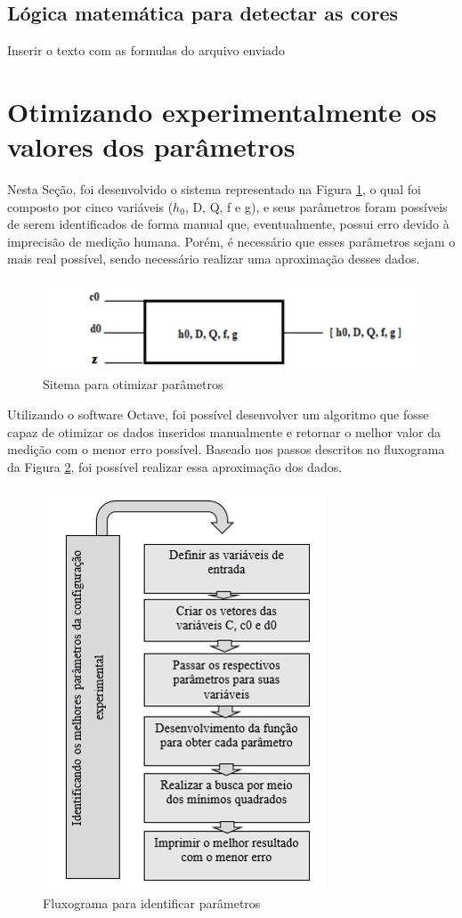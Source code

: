 \documentclass[a4paper, 12pt]{article}
\begin{document}
\subsection{Lógica matemática para detectar as cores}

Inserir o texto com as formulas do arquivo enviado


\section{Otimizando experimentalmente os valores dos parâmetros}
Nesta Seção, foi desenvolvido o sistema representado na Figura \ref{sitema_otimizacao}, o qual foi composto por cinco variáveis ($h_0$, D, Q, f e g), e seus parâmetros foram possíveis de serem identificados de forma manual que, eventualmente, possui erro devido à imprecisão de medição humana. Porém, é necessário que esses parâmetros sejam o mais real possível, sendo necessário realizar uma aproximação desses dados.

\begin{figure}[H]
	\centering
		\includegraphics[width=.55\linewidth]{sitema_otimizacao.png}
	\caption{Sitema para otimizar parâmetros}
	\label{sitema_otimizacao}
\end{figure}

Utilizando o software Octave, foi possível desenvolver um algoritmo que fosse capaz de otimizar os dados inseridos manualmente e retornar o melhor valor da medição com o menor erro possível. Baseado nos passos descritos no fluxograma da Figura \ref{identificar parametros}, foi possível realizar essa aproximação dos dados.


\begin{figure}[H]
	\centering
		\includegraphics[width=.55\linewidth]{fluxograma_identificar_parametros.png}
	\caption{Fluxograma para identificar parâmetros}
	\label{identificar parametros}
\end{figure}
\end{document}
